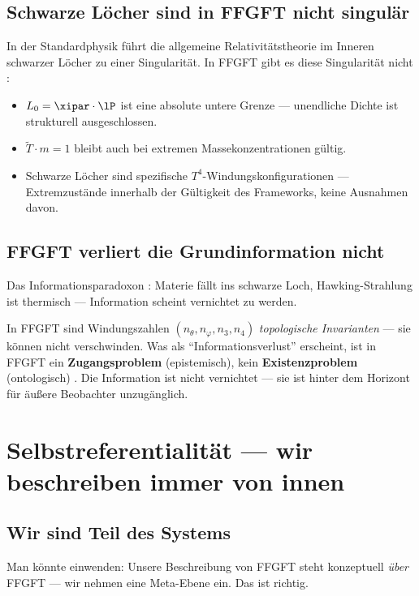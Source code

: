 \subsection{Schwarze Löcher sind in FFGFT nicht singulär}

In der Standardphysik führt die allgemeine Relativitätstheorie im Inneren schwarzer Löcher zu einer Singularität. In FFGFT gibt es diese Singularität nicht \cite{Pascher2026}:
\begin{itemize}
  \item $L_0 = \xipar \cdot \lP$ ist eine absolute untere Grenze --- unendliche Dichte ist strukturell ausgeschlossen.
  \item $\tilde{T} \cdot m = 1$ bleibt auch bei extremen Massekonzentrationen gültig.
  \item Schwarze Löcher sind spezifische $T^4$-Windungskonfigurationen --- Extremzustände innerhalb der Gültigkeit des Frameworks, keine Ausnahmen davon.
\end{itemize}

\subsection{FFGFT verliert die Grundinformation nicht}

Das Informationsparadoxon \cite{Hawking1974}: Materie fällt ins schwarze Loch, Hawking-Strahlung ist thermisch --- Information scheint vernichtet zu werden.

In FFGFT sind Windungszahlen $(n_\theta, n_\varphi, n_3, n_4)$ \emph{topologische Invarianten} --- sie können nicht verschwinden. Was als ``Informationsverlust'' erscheint, ist in FFGFT ein \textbf{Zugangsproblem} (epistemisch), kein \textbf{Existenzproblem} (ontologisch) \cite{Bekenstein1973}. Die Information ist nicht vernichtet --- sie ist hinter dem Horizont für äußere Beobachter unzugänglich.

\section{Selbstreferentialität --- wir beschreiben immer von innen}

\subsection{Wir sind Teil des Systems}

Man könnte einwenden: Unsere Beschreibung von FFGFT steht konzeptuell \emph{über} FFGFT --- wir nehmen eine Meta-Ebene ein. Das ist richtig.

